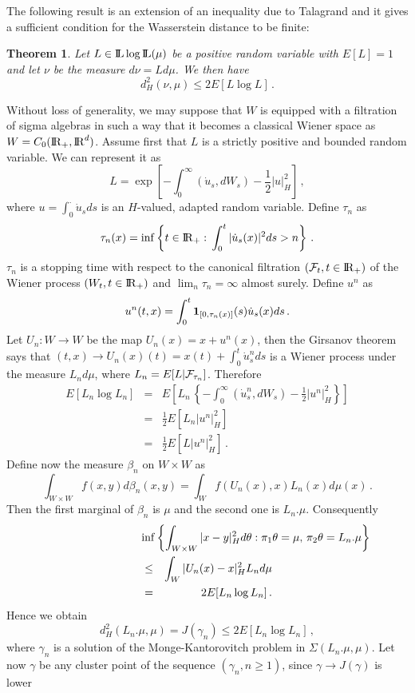 \documentclass[12pt,a4paper]{book}
\newtheorem{theorem}{Theorem}[section]
\newcommand{\beaa}{\begin{eqnarray*}}
\newcommand{\eeaa}{\end{eqnarray*}}
\newcommand{\reals}{{\rm I\!R}}
\newcommand{\ga}{\gamma}
\newcommand{\LL}{{\rm I\!L}}
\newcommand{\calF}{{\cal F}}
\newcommand{\R}{{\rm I\!R}}
\newcommand{\won}{{\mbox{\bf 1}}}
\newcommand{\proof}{\noindent {\bf Proof:\ }}
\begin{document}
\noindent
The following result is an extension of an inequality due to Talagrand
\cite{Tal} and it gives a sufficient condition for the Wasserstein
distance to be finite:
\begin{theorem}
\label{ineq-thm}
Let $L\in \LL\log\LL(\mu)$ be a positive random variable with
$E[L]=1$ and let  $\nu$ be  the measure $d\nu=Ld\mu$.  We then  have  
\begin{equation}
\label{tal-ineq}
d_H^2(\nu,\mu)\leq 2E[L\log L]\,.
\end{equation}
\end{theorem}
\proof
Without loss of generality, we may suppose  that $W$ is equipped with
a filtration of sigma algebras in 
such a way that it becomes a classical Wiener space as
$W=C_0(\reals_+,\R^d)$. Assume first that  $L$ is  a strictly positive
and bounded  random variable. We can represent
it as 
$$
L=\exp\left[-\int_0^\infty(\dot{u}_s,dW_s)-\frac{1}{2}|u|_H^2\right]\,,
$$
where $u=\int_0^\cdot \dot{u}_sds$ is an $H$-valued, adapted random
variable. Define $\tau_n$ as
$$
\tau_n(x)=\inf\left\{t\in \reals_+:\,\int_0^t|\dot{u}_s(x)|^2ds>n\right\}\,.
$$
$\tau_n$ is a stopping time with respect to the canonical filtration
$(\calF_t,t\in \reals_+)$ of the Wiener process $(W_t,t\in \reals_+)$
and $\lim_n\tau_n=\infty$ almost surely. Define $u^n$ as
$$
u^n(t,x)=\int_0^t\won_{[0,\tau_n(x)]}(s)\dot{u}_s(x)ds\,.
$$
Let  $U_n:W\to W$ be  the map
$U_n(x)=x+u^n(x)$, then the Girsanov 
theorem says that $(t,x)\to U_n(x)(t)=x(t)+\int_0^t\dot{u}^n_sds$ is a
Wiener process under the measure $L_nd\mu$, where
$L_n=E[L|\calF_{\tau_n}]$. Therefore 
\beaa
E[L_n\log L_n]&=&E\left[L_n\,\left\{-\int_0^\infty
      (\dot{u}^n_s,dW_s)-\frac{1}{2}|u^n|_H^2\right\}\right]\\
&=&\frac{1}{2}E[L_n|u^n|_H^2]\\
&=&\frac{1}{2}E[L|u^n|_H^2]\,.
\eeaa
Define now the measure $\beta_n$ on $W\times W$ as 
$$
\int_{W\times W} f(x,y)d\beta_n(x,y)=\int_W f(U_n(x),x)L_n(x)d\mu(x)\,.
$$
Then the first marginal of $\beta_n$ is $\mu$ and the second one is
$L_n.\mu$. Consequently
\beaa
\lefteqn{\inf\left\{\int_{W\times
  W}|x-y|_H^2d\theta:\pi_1\theta=\mu,\,\pi_2\theta=L_n.\mu\right\}}\\
&\leq& \int_W|U_n(x)-x|_H^2L_nd\mu\\
&=&2E[L_n\log L_n]\,.
\eeaa
Hence we obtain 
$$
d_H^2(L_n.\mu,\mu)=J(\ga_n)\leq 2E[L_n\log L_n]\,,
$$
where $\ga_n$ is a solution of the Monge-Kantorovitch  problem in
$\Sigma(L_n.\mu,\mu)$. Let now $\ga$ be any cluster point of the
sequence $(\ga_n,n\geq 1)$, since $\ga\to J(\ga)$ is lower
\end{document}
